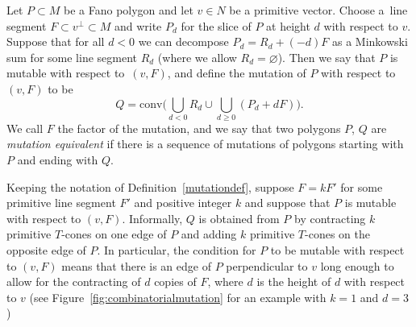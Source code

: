 \documentclass[11pt]{article}
\numberwithin{equation}{section}
\begin{document}
	\begin{Definition}\label{mutationdef}
		Let $P \subset M$ be a Fano polygon and let $v \in N$ be a primitive vector. Choose a~line segment $F \subset v^{\perp} \subset M$ and write $P_d$
		for the slice of $P$ at height $d$ with respect to $v$. Suppose that for all $d<0$ we can decompose $P_d=R_d+(-d)F$ as a Minkowski sum for
		some line segment $R_d$ (where we allow $R_d =\varnothing$).
		Then we say that $P$ is mutable with respect to~$(v, F)$, and define the mutation of $P$ with respect to $(v, F)$ to be
		\[
		Q=\text{conv} \biggl( \bigcup_{d<0} R_d \cup \bigcup_{d\geq 0}(P_d+dF) \biggr).
		\]
		We call $F$ the factor of the mutation, and we say that two polygons $P$, $Q$ are {\it mutation equivalent} if there is a sequence of mutations
		of polygons starting with $P$ and ending with $Q$.
	\end{Definition}
	Keeping the notation of Definition~\ref{mutationdef}, suppose $F=kF'$ for some primitive line segment $F'$ and positive integer $k$ and suppose
	that $P$ is mutable with respect to $(v, F)$. Informally, $Q$ is obtained from $P$ by contracting $k$ primitive $T$-cones on one edge of $P$ and adding $k$
	primitive $T$-cones on the opposite edge of $P$.
	In particular, the condition for $P$ to be mutable with respect to $(v, F)$ means that there is an edge of $P$ perpendicular to $v$
	long enough to allow for the contracting of $d$ copies of $F$, where $d$ is the height of $d$ with respect to $v$ (see Figure~\ref{fig:combinatorialmutation} for an example with $k=1$ and $d=3$)
\end{document}
